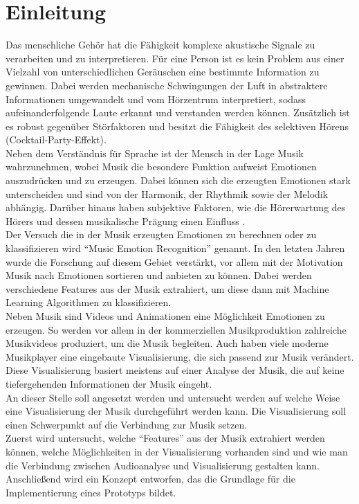 \documentclass[11pt,a4paper]{article}
\begin{document}
\section{Einleitung}
Das menschliche Gehör hat die Fähigkeit komplexe akustische Signale zu verarbeiten und zu interpretieren. Für eine Person ist es kein Problem aus einer Vielzahl von unterschiedlichen Geräuschen eine bestimmte Information zu gewinnen. Dabei werden mechanische Schwingungen der Luft in abstraktere Informationen umgewandelt und vom Hörzentrum interpretiert, sodass aufeinanderfolgende Laute erkannt und verstanden werden können. Zusätzlich ist es robust gegenüber Störfaktoren und besitzt die Fähigkeit des selektiven Hörens (Cocktail-Party-Effekt)\cite{hawley2004benefit}.\\
Neben dem Verständnis für Sprache ist der Mensch in der Lage Musik wahrzunehmen, wobei Musik die besondere Funktion aufweist Emotionen auszudrücken und zu erzeugen. Dabei können sich die erzeugten Emotionen stark unterscheiden und sind von der Harmonik, der Rhythmik sowie der Melodik abhängig. Darüber hinaus haben subjektive Faktoren, wie die Hörerwartung des Hörers und dessen musikalische Prägung einen Einfluss \cite[S. 2]{8a02f9c512933d46fbea928d23ac65e38b61b88caba9b38319a5d4952b5a6667}.\\
Der Versuch die in der Musik erzeugten Emotionen zu berechnen oder zu klassifizieren wird ``Music Emotion Recognition'' genannt. In den letzten Jahren wurde die Forschung auf diesem Gebiet verstärkt, vor allem mit der Motivation Musik nach Emotionen sortieren und anbieten zu können. Dabei werden verschiedene Features aus der Musik extrahiert, um diese dann mit Machine Learning Algorithmen zu klassifizieren.\\
Neben Musik sind Videos und Animationen eine Möglichkeit Emotionen zu erzeugen. So werden vor allem in der kommerziellen Musikproduktion zahlreiche Musikvideos produziert, um die Musik begleiten. Auch haben viele moderne Musikplayer eine eingebaute Visualisierung, die sich passend zur Musik verändert. Diese Visualisierung basiert meistens auf einer Analyse der Musik, die auf keine tiefergehenden Informationen der Musik eingeht.\\
An dieser Stelle soll angesetzt werden und untersucht werden auf welche Weise eine Visualisierung der Musik durchgeführt werden kann. Die Visualisierung soll einen Schwerpunkt auf die Verbindung zur Musik setzen.\\
Zuerst wird untersucht, welche ``Features'' aus der Musik extrahiert werden können, welche Möglichkeiten in der Visualisierung vorhanden sind und wie man die Verbindung zwischen Audioanalyse und Visualisierung gestalten kann. Anschließend wird ein Konzept entworfen, das die Grundlage für die Implementierung eines Prototyps bildet.
\end{document}

